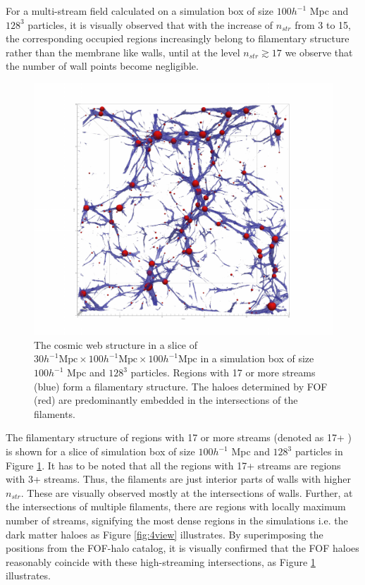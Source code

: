 
For a multi-stream field calculated on a simulation box of size $100 h^{-1}$ Mpc and $128^3$ particles, it is visually observed that with the increase of $n_{str}$ from 3 to 15,  the corresponding occupied regions increasingly belong to filamentary structure rather than the membrane like walls, until at the level $n_{str}  \gtrsim 17$ we observe that the number of wall points become negligible.

\begin{figure}
 \centering\includegraphics[width=18.5cm]{Chapter3/Source_v2/fig1.pdf} 
\caption{The cosmic web structure in a slice of  $30 h^{-1} \text{Mpc} \times 100 h^{-1} \text{Mpc} \times 100 h^{-1} \text{Mpc}$ in a simulation box of size $100 h^{-1}$ Mpc and $128^3$ particles. Regions with 17 or more streams (blue) form a filamentary structure. The haloes determined by FOF (red) are predominantly embedded in the intersections of the filaments.}
\label{fig:1full}
\end{figure}

The filamentary structure of regions with 17 or more streams (denoted as 17+ ) is shown for a slice of simulation box of size $100 h^{-1}$  Mpc and $128^3$  particles in Figure \ref{fig:1full}. It has to be noted that all the regions with 17+ streams are regions with 3+ streams. Thus, the filaments are just interior
parts  of walls with higher $n_{str}$. These are visually observed mostly at the intersections of walls. Further, at the intersections of multiple filaments, there are regions with locally maximum number of streams, signifying the most dense regions in the simulations i.e. the dark matter haloes as Figure \ref{fig:4view}
illustrates.
By superimposing the positions from the FOF-halo catalog, it is visually confirmed that the FOF haloes reasonably coincide with these high-streaming intersections, as Figure \ref{fig:1full} illustrates.

